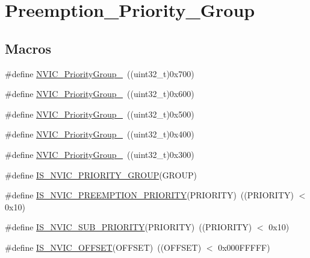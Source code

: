 \hypertarget{group___preemption___priority___group}{}\section{Preemption\+\_\+\+Priority\+\_\+\+Group}
\label{group___preemption___priority___group}
\subsection*{Macros}
\begin{DoxyCompactItemize}
\item 
\#define \mbox{\hyperlink{group___preemption___priority___group_gaeac0cf537f65d17bc19aee2410b2b60e}{N\+V\+I\+C\+\_\+\+Priority\+Group\+\_}}~((uint32\+\_\+t)0x700)
\item 
\#define \mbox{\hyperlink{group___preemption___priority___group_ga89bf0bf9e70f1a372a541b1b8d7493aa}{N\+V\+I\+C\+\_\+\+Priority\+Group\+\_}}~((uint32\+\_\+t)0x600)
\item 
\#define \mbox{\hyperlink{group___preemption___priority___group_ga505002e8b76aef65499ca371e40ec8b4}{N\+V\+I\+C\+\_\+\+Priority\+Group\+\_}}~((uint32\+\_\+t)0x500)
\item 
\#define \mbox{\hyperlink{group___preemption___priority___group_ga49bdbee77d4a70339d63c80462d49b4d}{N\+V\+I\+C\+\_\+\+Priority\+Group\+\_}}~((uint32\+\_\+t)0x400)
\item 
\#define \mbox{\hyperlink{group___preemption___priority___group_gaf9020c585da2a299328f0b06dee391a2}{N\+V\+I\+C\+\_\+\+Priority\+Group\+\_}}~((uint32\+\_\+t)0x300)
\item 
\#define \mbox{\hyperlink{group___preemption___priority___group_ga6569304a39fe4f91bd59b6a586c8ede9}{I\+S\+\_\+\+N\+V\+I\+C\+\_\+\+P\+R\+I\+O\+R\+I\+T\+Y\+\_\+\+G\+R\+O\+UP}}(G\+R\+O\+UP)
\item 
\#define \mbox{\hyperlink{group___preemption___priority___group_gaf30fd8f5960c2e28a772d8f16bb156dd}{I\+S\+\_\+\+N\+V\+I\+C\+\_\+\+P\+R\+E\+E\+M\+P\+T\+I\+O\+N\+\_\+\+P\+R\+I\+O\+R\+I\+TY}}(P\+R\+I\+O\+R\+I\+TY)~((P\+R\+I\+O\+R\+I\+TY) $<$ 0x10)
\item 
\#define \mbox{\hyperlink{group___preemption___priority___group_ga010705bc997dcff935b965b372cba61d}{I\+S\+\_\+\+N\+V\+I\+C\+\_\+\+S\+U\+B\+\_\+\+P\+R\+I\+O\+R\+I\+TY}}(P\+R\+I\+O\+R\+I\+TY)~((P\+R\+I\+O\+R\+I\+TY) $<$ 0x10)
\item 
\#define \mbox{\hyperlink{group___preemption___priority___group_ga1184bbb97d758385f98ab40dd5e5af59}{I\+S\+\_\+\+N\+V\+I\+C\+\_\+\+O\+F\+F\+S\+ET}}(O\+F\+F\+S\+ET)~((O\+F\+F\+S\+ET) $<$ 0x000\+F\+F\+F\+F\+F)
\end{DoxyCompactItemize}


